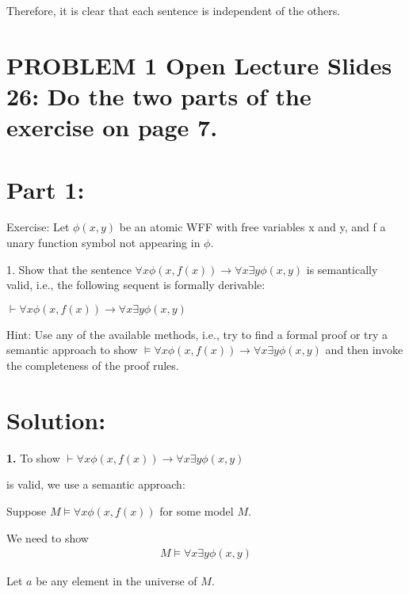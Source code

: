 \documentclass{article}
\begin{document}
Therefore, it is clear that each sentence is independent of the others.
\newpage

\section*{PROBLEM 1  Open Lecture Slides 26: Do the two parts of the exercise on page 7.}

\section*{Part 1:}
\begin{mdframed}
    Exercise:
    Let $\phi(x, y)$ be an atomic WFF with free variables x and y, and f a unary function symbol not appearing in $\phi$.
    \vspace{1em}

    1. Show that the sentence $\forall x \phi(x, f (x)) \rightarrow \forall x\exists y \phi(x, y)$ is semantically
    valid, i.e., the following sequent is formally derivable:
    \vspace{1em}

    $\vdash \forall x \phi(x, f (x)) \rightarrow \forall x \exists y \phi(x, y)$
    \vspace{1em}

    Hint: Use any of the available methods, i.e., try to find a formal proof
    or try a semantic approach to show $\models \forall x \phi(x, f (x)) \rightarrow \forall x\exists y \phi(x, y)$
    and then invoke the completeness of the proof rules.
\end{mdframed}

\section*{Solution:}
\textbf{1.} To show $\vdash \forall x \phi(x, f(x)) \rightarrow \forall x \exists y \phi(x, y)$


\vspace{1em}
is valid, we use a semantic approach:

\vspace{1em}
Suppose $M \models \forall x \phi(x, f(x))$ for some model $M$. 

\vspace{1em}
We need to show 
\[\begin{aligned}
    M \models \forall x \exists y \phi(x, y)
\end{aligned}\]

\vspace{1em}
Let $a$ be any element in the universe of $M$. 
\end{document}
